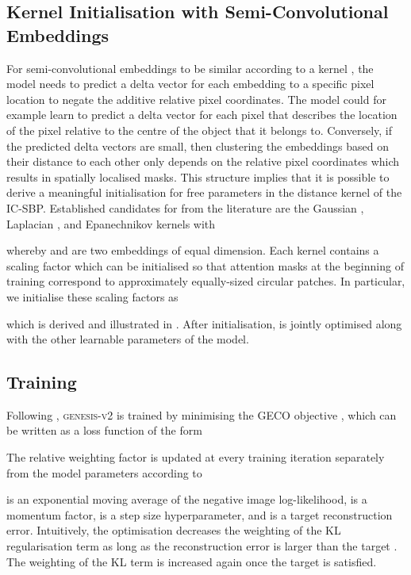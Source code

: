\documentclass{article}
\begin{document}
\subsection{Kernel Initialisation with Semi-Convolutional Embeddings}
\label{sec:semiconv}
For semi-convolutional embeddings to be similar according to a kernel , the model needs to predict a delta vector for each embedding to a specific pixel location to negate the additive relative pixel coordinates.
The model could for example learn to predict a delta vector for each pixel that describes the location of the pixel relative to the centre of the object that it belongs to.
Conversely, if the predicted delta vectors are small, then clustering the embeddings based on their distance to each other only depends on the relative pixel coordinates which results in spatially localised masks.
This structure implies that it is possible to derive a meaningful initialisation for free parameters in the distance kernel  of the IC-SBP.
Established candidates for  from the literature are the Gaussian  \cite{novotny2018semi}, Laplacian  \cite{novotny2018semi}, and Epanechnikov  kernels \cite{kong2018recurrent} with

whereby  and  are two embeddings of equal dimension.
Each kernel contains a scaling factor  which can be initialised so that attention masks at the beginning of training correspond to approximately equally-sized circular patches.
In particular, we initialise these scaling factors as

which is derived and illustrated in .
After initialisation,  is jointly optimised along with the other learnable parameters of the model.

\subsection{Training}
\label{sec:training}
Following \citet{engelcke2020genesis}, \textsc{genesis-v2} is trained by minimising the GECO objective \cite{rezende2018taming}, which can be written as a loss function of the form

The relative weighting factor  is updated at every training iteration separately from the model parameters according to

 is an exponential moving average of the negative image log-likelihood,  is a momentum factor,  is a step size hyperparameter, and  is a target reconstruction error.
Intuitively, the optimisation decreases the weighting of the KL regularisation term as long as the reconstruction error is larger than the target .
The weighting of the KL term is increased again once the target is satisfied.
\end{document}
